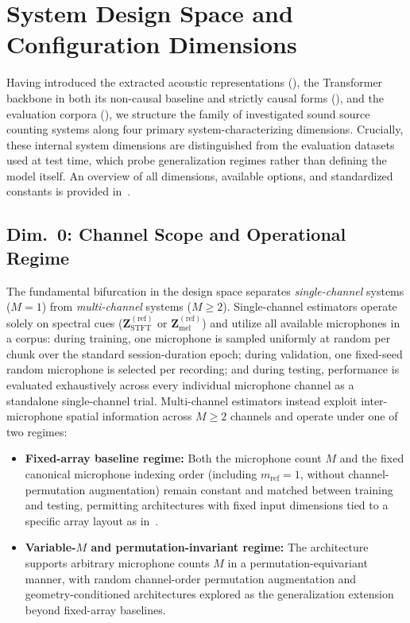 \documentclass[lettersize,journal]{IEEEtran}
\begin{document}
\section{System Design Space and Configuration Dimensions}
\label{sec:design_space}

Having introduced the extracted acoustic representations (), the Transformer backbone in both its non-causal baseline and strictly causal forms (), and the evaluation corpora (), we structure the family of investigated sound source counting systems along four primary system-characterizing dimensions. Crucially, these internal system dimensions are distinguished from the evaluation datasets used at test time, which probe generalization regimes rather than defining the model itself. An overview of all dimensions, available options, and standardized constants is provided in~.

\subsection{Dim.~0: Channel Scope and Operational Regime}
\label{sec:dim_scope}
The fundamental bifurcation in the design space separates \emph{single-channel} systems ($M = 1$) from \emph{multi-channel} systems ($M \ge 2$). Single-channel estimators operate solely on spectral cues ($\mathbf{Z}_{\mathrm{STFT}}^{(\mathrm{ref})}$ or $\mathbf{Z}_{\mathrm{mel}}^{(\mathrm{ref})}$) and utilize all available microphones in a corpus: during training, one microphone is sampled uniformly at random per chunk over the standard session-duration epoch; during validation, one fixed-seed random microphone is selected per recording; and during testing, performance is evaluated exhaustively across every individual microphone channel as a standalone single-channel trial. Multi-channel estimators instead exploit inter-microphone spatial information across $M \ge 2$ channels and operate under one of two regimes:
\begin{itemize}
  \item \textbf{Fixed-array baseline regime:} Both the microphone count $M$ and the fixed canonical microphone indexing order (including $m_{\mathrm{ref}} = 1$, without channel-permutation augmentation) remain constant and matched between training and testing, permitting architectures with fixed input dimensions tied to a specific array layout as in~\cite{cornell2022overlapped}.
  \item \textbf{Variable-$M$ and permutation-invariant regime:} The architecture supports arbitrary microphone counts $M$ in a permutation-equivariant manner, with random channel-order permutation augmentation and geometry-conditioned architectures explored as the generalization extension beyond fixed-array baselines.
\end{itemize}
\end{document}
